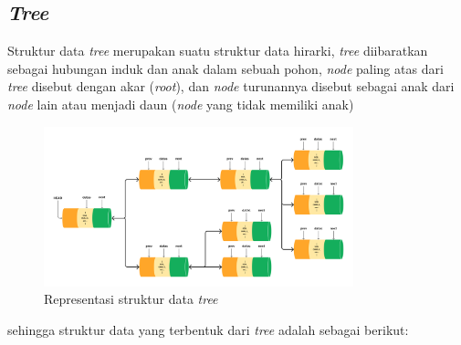 \subsection{\emph{Tree}}
Struktur data \emph{tree} merupakan suatu struktur data hirarki, \emph{tree} diibaratkan
sebagai hubungan induk dan anak dalam sebuah pohon, \emph{node} paling atas dari 
\emph{tree} disebut dengan akar (\emph{root}), dan \emph{node} turunannya disebut 
sebagai anak dari \emph{node} lain atau menjadi daun (\emph{node} yang tidak memiliki 
anak)
\begin{figure}[H]
	\centering{}
	\includegraphics[width=0.8\textwidth]{gambar/tree_example.png}
	\caption{Representasi struktur data \emph{tree}}
\end{figure}

sehingga struktur data yang terbentuk dari \emph{tree} adalah sebagai berikut: 


